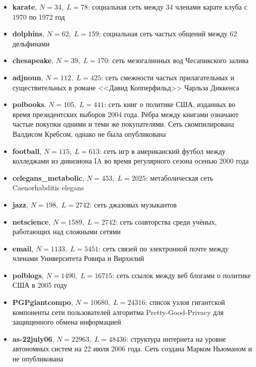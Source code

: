 \begin{itemize}
	
	\item \textbf{karate}, $N = 34,\;L = 78$: социальная сеть между 34 членами карате клуба с 1970 по 1972 год \cite{Zachary:1977}
	\item \textbf{dolphins}, $N = 62,\;L = 159$: социальная сеть частых общений между 62 дельфинами \cite{Lusseau&al:2003}
	\item \textbf{chesapeake}, $N = 39,\;L = 170$: сеть мезогалинных вод Чесапикского залива \cite{Baird&Ulanowicz:1989}
	\item \textbf{adjnoun}, $N = 112,\;L = 425$: сеть смежности частых прилагательных и существительных в романе <<Давид Копперфильд>> Чарльза Диккенса \cite{Newman:2006}
	\item \textbf{polbooks}, $N = 105,\;L = 441$: сеть книг о политике США, изданных во время президентских выборов 2004 года. Рёбра между книгами означают частые покупки одними и теми же покупателями. Сеть скомпилирована Валдисом Кребсом, однако не была опубликована
	\item \textbf{football}, $N = 115,\;L = 613$: сеть игр в американский футбол между колледжами из дивизиона IA во время регулярного сезона осенью 2000 года \cite{Girvan&Newman:2002}
	\item \textbf{celegans\_metabolic}, $N = 453,\;L = 2025$: метаболическая сеть Caenorhabditis elegans \cite{Duch&Arenas:2005}
	\item \textbf{jazz}, $N = 198,\;L = 2742$: сеть джазовых музыкантов \cite{Gleiser&Danon:2003}
	\item \textbf{netscience}, $N = 1589,\;L = 2742$: сеть соавторства среди учёных, работающих над сложными сетями \cite{Newman:2006}
	\item \textbf{email}, $N = 1133,\;L = 5451$: сеть связей по электронной почте между членами Университета Ровира и Вирхилий \cite{Guimera&al:2003}
	\item \textbf{polblogs}, $N = 1490,\;L = 16715$: сеть ссылок между веб блогами о политике США в 2005 году \cite{Adamic&Glance:2005}
	\item \textbf{PGPgiantcompo}, $N = 10680,\;L = 24316$: список узлов гигантской компоненты сети пользователей алгоритма Pretty-Good-Privacy для защищенного обмена информацией \cite{Boguna&al:2004}
	\item \textbf{as-22july06}, $N = 22963,\;L = 48436$: структура интернета на уровне автономных систем на 22 июля 2006 года. Сеть создана Марком Ньюманом и не опубликована

\end{itemize}
